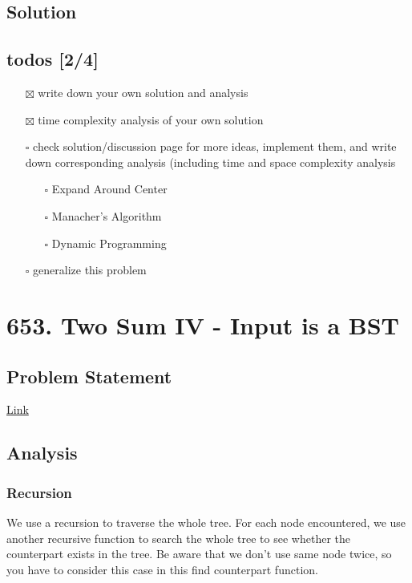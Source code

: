 \documentclass[12pt]{article}
\begin{document}
\subsection{Solution}
\label{sec:org60bef5b}

\subsection{todos [2/4]}
\label{sec:org7b725dd}
\begin{itemize}
\item[{$\boxtimes$}] write down your own solution and analysis
\item[{$\boxtimes$}] time complexity analysis of your own solution
\item[{$\square$}] check solution/discussion page for more ideas, implement them, and write down corresponding analysis (including time and space complexity analysis
\begin{itemize}
\item[{$\square$}] Expand Around Center
\item[{$\square$}] Manacher's Algorithm
\item[{$\square$}] Dynamic Programming
\end{itemize}
\item[{$\square$}] generalize this problem
\end{itemize}
\section{653. Two Sum IV - Input is a BST}
\label{sec:org72c4f76}
\subsection{Problem Statement}
\label{sec:org3d17387}
\href{https://leetcode.com/problems/two-sum-iv-input-is-a-bst/}{Link}
\subsection{Analysis}
\label{sec:org3167bbb}
\subsubsection{Recursion}
\label{sec:org57a3b1c}
We use a recursion to traverse the whole tree. For each node encountered, we use another recursive function to search the whole tree to see whether the counterpart exists in the tree. Be aware that we don't use same node twice, so you have to consider this case in this find counterpart function.
\end{document}
